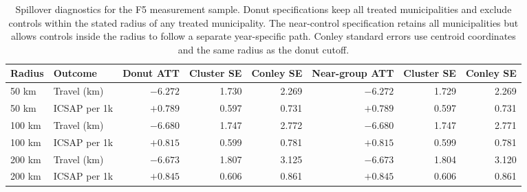 \begin{table}[h!]
\centering
\caption{Spillover diagnostics for the F5 measurement sample. Donut specifications keep all treated municipalities and exclude controls within the stated radius of any treated municipality. The near-control specification retains all municipalities but allows controls inside the radius to follow a separate year-specific path. Conley standard errors use centroid coordinates and the same radius as the donut cutoff.}
\label{tab:donut-spillover}
\small
\begin{tabular}{llrrrrrr}
\toprule
Radius & Outcome & Donut ATT & Cluster SE & Conley SE & Near-group ATT & Cluster SE & Conley SE \\
\midrule
50 km & Travel (km) & $-6.272$ & 1.730 & 2.269 & $-6.272$ & 1.729 & 2.269 \\
50 km & ICSAP per 1k & $+0.789$ & 0.597 & 0.731 & $+0.789$ & 0.597 & 0.731 \\
100 km & Travel (km) & $-6.680$ & 1.747 & 2.772 & $-6.680$ & 1.747 & 2.771 \\
100 km & ICSAP per 1k & $+0.815$ & 0.599 & 0.781 & $+0.815$ & 0.599 & 0.781 \\
200 km & Travel (km) & $-6.673$ & 1.807 & 3.125 & $-6.673$ & 1.804 & 3.120 \\
200 km & ICSAP per 1k & $+0.845$ & 0.606 & 0.861 & $+0.845$ & 0.606 & 0.861 \\
\bottomrule
\end{tabular}
\end{table}
